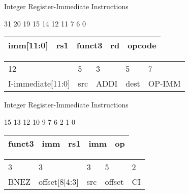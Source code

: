     \begin{frame}{Integer Register-Immediate Instructions}

        \begin{center}

            \begin{flushleft}
                \footnotesize
                31 \hspace{2.95cm} 20 19 \hspace{1.52cm} 15 14 \hspace{1.50cm} 12 11 \hspace{1.70cm} 7 6 \hspace{2cm} 0
                \normalsize
            \end{flushleft}
            
            \begin{tabular}{ | p{3cm} | p{2cm} | p{2cm} | p{2cm} | p{2cm} | }
                \hline
                imm[11:0] & rs1 & funct3 & rd & opcode \\
                \hline
            \end{tabular}
            \begin{tabular}{p{3cm} p{2cm} p{2cm} p{2cm} p{2cm}}
             12 & 5 & 3 & 5 & 7 \\ 
             I-immediate[11:0] & src & ADDI & dest & OP-IMM 
            \end{tabular}

        \end{center}

    \end{frame}

    \begin{frame}{Integer Register-Immediate Instructions}

        \begin{center}

            \begin{flushleft}
                \footnotesize
                \hspace{0.5cm} 15 \hspace{2.85cm} 13 12 \hspace{1.52cm} 10 9 \hspace{1.85cm} 7 6 \hspace{1.9cm} 2 1 \hspace{1cm} 0
                \normalsize
            \end{flushleft}
            
            \begin{tabular}{ | p{2.95cm} | p{2cm} | p{2cm} | p{2cm} | p{1cm} | }
                \hline
                funct3 & imm & rs1 & imm & op \\
                \hline
            \end{tabular}
            \begin{tabular}{p{2.95cm} p{2cm} p{2cm} p{2cm} p{1cm}}
             3 & 3 & 3 & 5 & 2 \\ 
             BNEZ & offset[8|4:3] & src & offset & CI 
            \end{tabular}

        \end{center}

    \end{frame}
